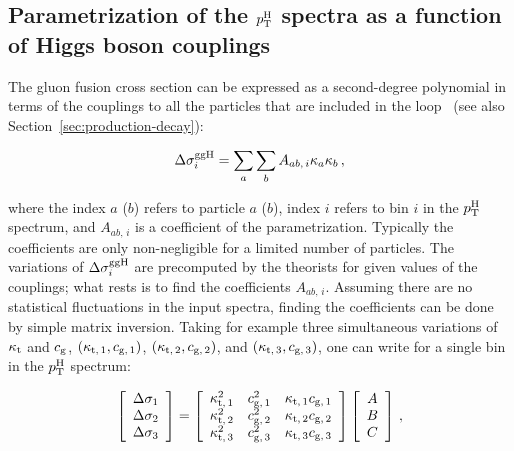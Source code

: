 \subsection{Parametrization of the \texorpdfstring{$p_\mathrm{T}^\mathrm{H}$}{pTH} spectra as a function of Higgs boson couplings}


The gluon fusion cross section can be expressed as a second-degree polynomial in terms of the couplings to all the particles that are included in the loop~\cite{higgshunter} (see also Section~\ref{sec:production-decay}):
% 
\begin{linenomath*}
\begin{equation}
\label{eq:kappa-parametrization}
\Delta\sigma^{\mathrm{g}\mathrm{g}\mathrm{H}}_i = \sum_a \sum_b A_{ab,\,i} \kappa_a \kappa_b 
\,,
\end{equation}
\end{linenomath*}
% 
where the index $a$ ($b$) refers to particle $a$ ($b$), index $i$ refers to bin $i$ in the $p_\mathrm{T}^\mathrm{H}$ spectrum, and $A_{ab,\,i}$ is a coefficient of the parametrization.
% 
Typically the coefficients are only non-negligible for a limited number of particles.
% 
The variations of $\Delta\sigma^{\mathrm{g}\mathrm{g}\mathrm{H}}_i$ are precomputed by the theorists for given values of the couplings; what rests is to find the coefficients $A_{ab,\,i}$.
% 
Assuming there are no statistical fluctuations in the input spectra, finding the coefficients can be done by simple matrix inversion.
% 
Taking for example three simultaneous variations of $\kappa_{\mathrm{t}}$ and $c_\mathrm{g}$, $(\kappa_{\mathrm{t},\,1}, c_{\mathrm{g},\,1})$, $(\kappa_{\mathrm{t},\,2}, c_{\mathrm{g},\,2})$, and $(\kappa_{\mathrm{t},\,3}, c_{\mathrm{g},\,3})$, one can write for a single bin in the $p_\mathrm{T}^\mathrm{H}$ spectrum:
% 
\begin{linenomath*}
\begin{equation}
\left[\begin{array}{c}
\Delta\sigma_1 \\
\Delta\sigma_2 \\
\Delta\sigma_3
\end{array}\right]
    =
    \left[\begin{array}{ccc}
        \kappa_{\mathrm{t},\,1}^2  &  c_{\mathrm{g},\,1}^2   &  \kappa_{\mathrm{t},\,1} c_{\mathrm{g},\,1} \\
        \kappa_{\mathrm{t},\,2}^2  &  c_{\mathrm{g},\,2}^2   &  \kappa_{\mathrm{t},\,2} c_{\mathrm{g},\,2} \\
        \kappa_{\mathrm{t},\,3}^2  &  c_{\mathrm{g},\,3}^2   &  \kappa_{\mathrm{t},\,3} c_{\mathrm{g},\,3}
        \end{array}\right]
    \left[\begin{array}{c}
        A \\
        B \\
        C
        \end{array}\right]
    \,,
\end{equation}
\end{linenomath*}
